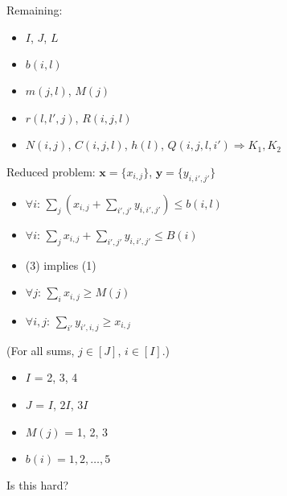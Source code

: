 \documentclass{article}
\begin{document}
\noindent
Remaining:
\begin{itemize}
\item $I$, $J$, $L$
\item $b(i, l)$
\item $m(j, l)$, $M(j)$
\item $r(l, l', j)$, $R(i, j, l)$
\item $N(i, j)$, $C(i, j, l)$, $h(l)$, $Q(i, j, l, i') \Rightarrow K_1, K_2$
\end{itemize}

\noindent 
Reduced problem:
$\mathbf x = \{x_{i, j}\}$, $\mathbf y = \{y_{i, i' ,j'}\}$
\begin{itemize}
\item $\forall i$: $\sum_j \left(x_{i,j} + \sum_{i', j'} y_{i, i', j'} \right) \leq b(i,l)$
\item $\forall i$: $\sum_j x_{i,j} + \sum_{i', j'} y_{i, i', j'} \leq B(i)$
\item (3) implies (1)
\item $\forall j$: $\sum_{i} x_{i, j} \geq M(j)$
\item $\forall i, j$: $\sum_{i'} y_{i', i, j} \geq x_{i, j}$
\end{itemize}
(For all sums, $j \in [J]$, $i \in [I]$.)

\begin{itemize}
\item $I$ = 2, 3, 4
\item $J$ = $I$, $2I$, $3I$
\item $M(j)$ = 1, 2, 3
\item $b(i) = 1, 2, \ldots, 5$
\end{itemize}
Is this hard?
\end{document}

